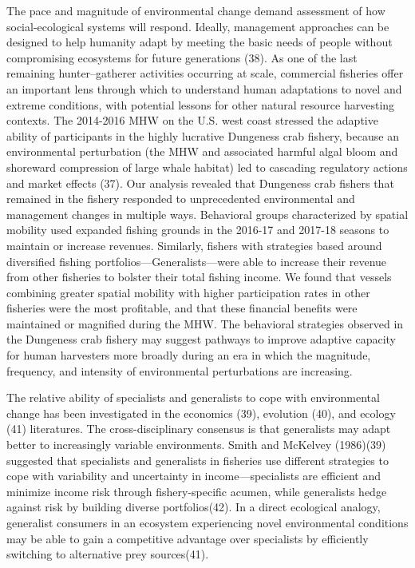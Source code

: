 \documentclass[9pt,twocolumn,twoside,lineno]{pnas-new}
\begin{document}
The pace and magnitude of environmental change demand assessment of how
social-ecological systems will respond. Ideally, management approaches
can be designed to help humanity adapt by meeting the basic needs of
people without compromising ecosystems for future generations (38). As
one of the last remaining hunter--gatherer activities occurring at
scale, commercial fisheries offer an important lens through which to
understand human adaptations to novel and extreme conditions, with
potential lessons for other natural resource harvesting contexts. The
2014-2016 MHW on the U.S. west coast stressed the adaptive ability of
participants in the highly lucrative Dungeness crab fishery, because an
environmental perturbation (the MHW and associated harmful algal bloom
and shoreward compression of large whale habitat) led to cascading
regulatory actions and market effects (37). Our analysis revealed that
Dungeness crab fishers that remained in the fishery responded to
unprecedented environmental and management changes in multiple ways.
Behavioral groups characterized by spatial mobility used expanded
fishing grounds in the 2016-17 and 2017-18 seasons to maintain or
increase revenues. Similarly, fishers with strategies based around
diversified fishing portfolios---Generalists---were able to increase
their revenue from other fisheries to bolster their total fishing
income. We found that vessels combining greater spatial mobility with
higher participation rates in other fisheries were the most profitable,
and that these financial benefits were maintained or magnified during
the MHW. The behavioral strategies observed in the Dungeness crab
fishery may suggest pathways to improve adaptive capacity for human
harvesters more broadly during an era in which the magnitude, frequency,
and intensity of environmental perturbations are increasing.

The relative ability of specialists and generalists to cope with
environmental change has been investigated in the economics (39),
evolution (40), and ecology (41) literatures. The cross-disciplinary
consensus is that generalists may adapt better to increasingly variable
environments. Smith and McKelvey (1986)(39) suggested that specialists
and generalists in fisheries use different strategies to cope with
variability and uncertainty in income---specialists are efficient and
minimize income risk through fishery-specific acumen, while generalists
hedge against risk by building diverse portfolios(42). In a direct
ecological analogy, generalist consumers in an ecosystem experiencing
novel environmental conditions may be able to gain a competitive
advantage over specialists by efficiently switching to alternative prey
sources(41).
\end{document}

